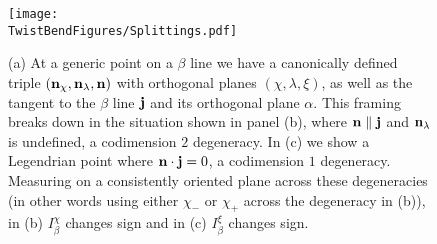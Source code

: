 \begin{figure}[htbp]
    \centering
    \texttt{[image: \\TwistBendFigures/Splittings.pdf]}
    \caption{(a) At a generic point on a $\beta$ line we have a canonically defined triple $(\mathbf{n}_\chi, \mathbf{n}_\lambda, \mathbf{n})$ with orthogonal planes $(\chi,\lambda, \xi)$, as well as the tangent to the $\beta$ line $\mathbf{j}$ and its orthogonal plane $\alpha$. This framing breaks down in the situation shown in panel (b), where  $\mathbf{n} \parallel \mathbf{j}$ and $\mathbf{n}_\lambda$ is undefined, a codimension $2$ degeneracy. In (c) we show a Legendrian point where $\mathbf{n} \cdot \mathbf{j} = 0$, a codimension $1$ degeneracy. Measuring on a consistently oriented plane across these degeneracies (in other words using either $\chi_-$ or $\chi_+$ across the degeneracy in (b)), in (b) $I^\chi_\beta$ changes sign and in (c) $I^\xi_\beta$ changes sign.}
    \label{fig:Splittings}
\end{figure}

